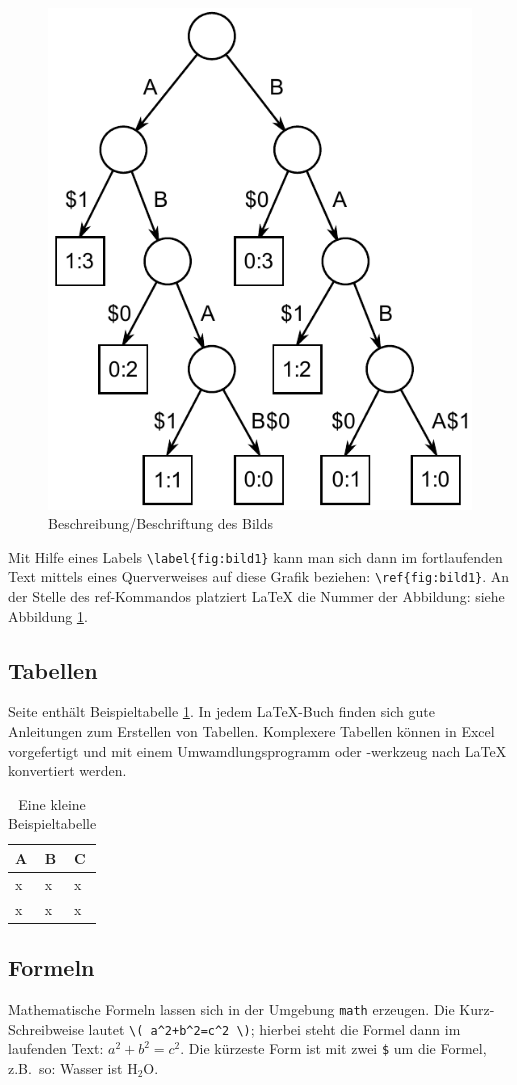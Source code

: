 \begin{figure}[ht]
\centering
\includegraphics[width=.4\textwidth]{images/Suffix_tree_ABAB_BABA}
\caption{\label{fig:bild1}Beschreibung/Beschriftung des Bilds}
\end{figure}

Mit Hilfe eines Labels \verb|\label{fig:bild1}| kann man sich dann im fortlaufenden Text mittels eines Querverweises auf diese Grafik beziehen: \verb|\ref{fig:bild1}|. An der Stelle des ref-Kommandos platziert LaTeX die Nummer der Abbildung: \glq siehe Abbildung \ref{fig:bild1}\grq.


\subsection{Tabellen}

Seite \pageref{tab:beispieltabelle} enthält Beispieltabelle \ref{tab:beispieltabelle}. In jedem \LaTeX{}-Buch finden sich gute Anleitungen zum Erstellen von Tabellen. Komplexere Tabellen können in Excel vorgefertigt und mit einem Umwamdlungsprogramm oder -werkzeug nach LaTeX konvertiert werden.

\begin{table}[h]
\begin{center}
\begin{tabular}{|l|l|l|}
	A & B & C \\\hline
	x & x & x \\
	x & x & x
\end{tabular}
\end{center}
\caption{Eine kleine Beispieltabelle}
\label{tab:beispieltabelle}
\end{table}


\subsection{Formeln}

Mathematische Formeln lassen sich in der Umgebung  \verb|math| erzeugen. Die Kurz- Schreibweise lautet \verb|\( a^2+b^2=c^2 \)|;  hierbei steht die Formel dann im laufenden Text: \( a^2+b^2=c^2 \). Die kürzeste Form ist mit zwei \verb|$| um die Formel, z.B.~so: Wasser ist H$_2$O.

